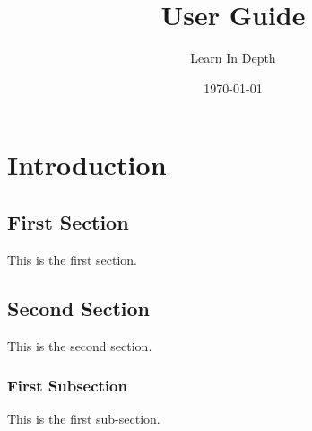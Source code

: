 \documentclass[12pt, letterpaper]{report}
\title{User Guide}
\author{Learn In Depth}
\date{\today}
\begin{document}
\chapter{Introduction}

\section{First Section}

This is the first section.

\section{Second Section}

This is the second section.

\subsection{First Subsection}

This is the first sub-section.
\end{document}
